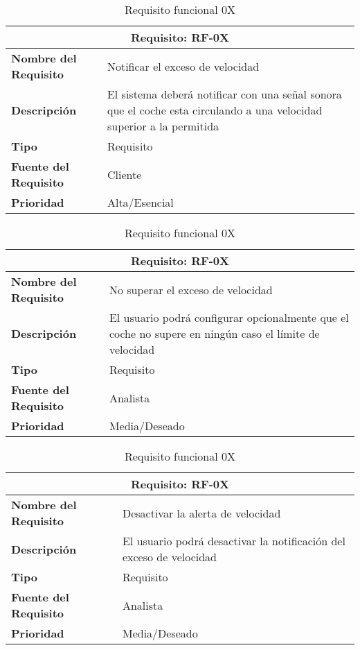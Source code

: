 \documentclass[10pt,a4paper,oldfontcommands]{dpds}
\begin{document}
\begin{table}[h]
\begin{center}
\begin{tabular}{p{} p{7cm}}
\multicolumn{2}{c}{\textbf{Requisito: RF-0X} } \\
\hline \hline
\textbf{Nombre del Requisito} & Notificar el exceso de velocidad \\
\textbf{Descripción} & El sistema deberá notificar con una señal sonora que el coche esta circulando a una velocidad superior a la permitida \\
\textbf{Tipo} & Requisito  \\
\textbf{Fuente del Requisito} & Cliente \\
\textbf{Prioridad} & Alta/Esencial  \\ \hline
\end{tabular}
\caption{Requisito funcional 0X}
\label{tab:personal}
\end{center}
\end{table}

\begin{table}[h]
\begin{center}
\begin{tabular}{p{} p{7cm}}
\multicolumn{2}{c}{\textbf{Requisito: RF-0X} } \\
\hline \hline
\textbf{Nombre del Requisito} & No superar el exceso de velocidad \\
\textbf{Descripción} & El usuario podrá configurar opcionalmente que el coche no supere en ningún caso el límite de velocidad \\
\textbf{Tipo} & Requisito  \\
\textbf{Fuente del Requisito} & Analista  \\
\textbf{Prioridad} & Media/Deseado  \\ \hline
\end{tabular}
\caption{Requisito funcional 0X}
\label{tab:personal}
\end{center}
\end{table}

\begin{table}[h]
\begin{center}
\begin{tabular}{p{} p{7cm}}
\multicolumn{2}{c}{\textbf{Requisito: RF-0X} } \\
\hline \hline
\textbf{Nombre del Requisito} & Desactivar la alerta de velocidad \\
\textbf{Descripción} & El usuario podrá desactivar la notificación del exceso de velocidad \\
\textbf{Tipo} & Requisito  \\
\textbf{Fuente del Requisito} & Analista  \\
\textbf{Prioridad} & Media/Deseado  \\ \hline
\end{tabular}
\caption{Requisito funcional 0X}
\label{tab:personal}
\end{center}
\end{table}
\end{document}
